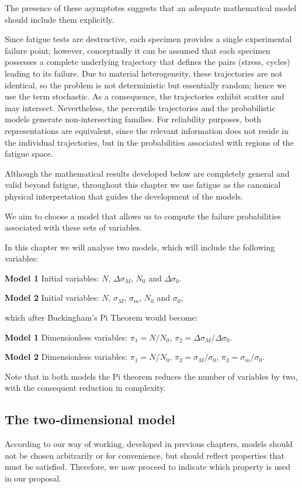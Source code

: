 The presence of these asymptotes suggests that an adequate mathematical model should include them explicitly.

Since fatigue tests are destructive, each specimen provides a single experimental failure point; however, conceptually it can be assumed that each specimen possesses a complete underlying trajectory that defines the pairs (stress, cycles) leading to its failure. Due to material heterogeneity, these trajectories are not identical, so the problem is not deterministic but essentially random; hence we use the term stochastic. As a consequence, the trajectories exhibit scatter and may intersect. Nevertheless, the percentile trajectories and the probabilistic models generate non‑intersecting families. For reliability purposes, both representations are equivalent, since the relevant information does not reside in the individual trajectories, but in the probabilities associated with regions of the fatigue space.

Although the mathematical results developed below are completely general and valid beyond fatigue, throughout this chapter we use fatigue as the canonical physical interpretation that guides the development of the models.

We aim to choose a model that allows us to compute the failure probabilities associated with these sets of variables.

In this chapter we will analyse two models, which will include the following variables:

\textbf{Model 1} Initial variables: $N$, $\Delta\sigma_M$, $N_0$ and $\Delta\sigma_0$.

\textbf{Model 2} Initial variables: $N$, $\sigma_M$, $\sigma_m$, $N_0$ and $\sigma_0$,

which after Buckingham’s Pi Theorem would become:

\textbf{Model 1} Dimensionless variables: $\pi_1 = N/N_0$, $\pi_2 = \Delta\sigma_M/\Delta\sigma_0$.

\textbf{Model 2} Dimensionless variables: $\pi_1 = N/N_0$, $\pi_2 = \sigma_M/\sigma_0$, $\pi_3 = \sigma_m/\sigma_0$.

Note that in both models the Pi theorem reduces the number of variables by two, with the consequent reduction in complexity.

\subsection{The two‑dimensional model}
According to our way of working, developed in previous chapters, models should not be chosen arbitrarily or for convenience, but should reflect properties that must be satisfied. Therefore, we now proceed to indicate which property is used in our proposal.

